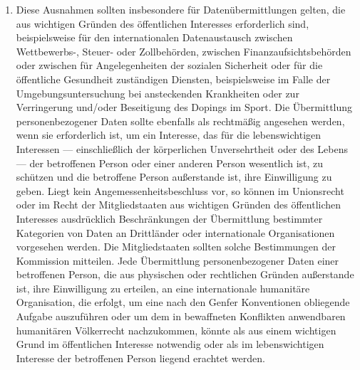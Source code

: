\begin{enumerate}
   \item Diese Ausnahmen sollten insbesondere für Datenübermittlungen gelten, die aus wichtigen Gründen des öffentlichen
    Interesses erforderlich sind, beispielsweise für den internationalen Datenaustausch zwischen Wettbewerbs-, Steuer-
    oder Zollbehörden, zwischen Finanzaufsichtsbehörden oder zwischen für Angelegenheiten der sozialen Sicherheit oder
    für die öffentliche Gesundheit zuständigen Diensten, beispielsweise im Falle der Umgebungsuntersuchung bei
    ansteckenden Krankheiten oder zur Verringerung und/oder Beseitigung des Dopings im Sport. Die Übermittlung
    personenbezogener Daten sollte ebenfalls als rechtmäßig angesehen werden, wenn sie erforderlich ist, um ein
    Interesse, das für die lebenswichtigen Interessen — einschließlich der körperlichen Unversehrtheit oder des
    Lebens — der betroffenen Person oder einer anderen Person wesentlich ist, zu schützen und die betroffene Person
    außerstande ist, ihre Einwilligung zu geben. Liegt kein Angemessenheitsbeschluss vor, so können im Unionsrecht oder
    im Recht der Mitgliedstaaten aus wichtigen Gründen des öffentlichen Interesses ausdrücklich Beschränkungen der
    Übermittlung bestimmter Kategorien von Daten an Drittländer oder internationale Organisationen vorgesehen werden.
    Die Mitgliedstaaten sollten solche Bestimmungen der Kommission mitteilen. Jede Übermittlung personenbezogener Daten
    einer betroffenen Person, die aus physischen oder rechtlichen Gründen außerstande ist, ihre Einwilligung zu
    erteilen, an eine internationale humanitäre Organisation, die erfolgt, um eine nach den Genfer Konventionen
    obliegende Aufgabe auszuführen oder um dem in bewaffneten Konflikten anwendbaren humanitären Völkerrecht
    nachzukommen, könnte als aus einem wichtigen Grund im öffentlichen Interesse notwendig oder als im lebenswichtigen
    Interesse der betroffenen Person liegend erachtet werden.%
   \label{itm:eg-112}
   


\end{enumerate}
